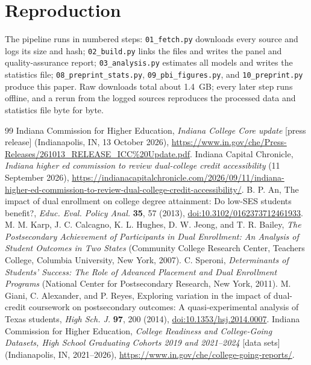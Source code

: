 \documentclass[aps,prd,reprint,superscriptaddress,nofootinbib,floatfix]{revtex4-2}
\begin{document}
\section{Reproduction}\label{app:repro}

The pipeline runs in numbered steps: \texttt{01\_fetch.py} downloads every source and logs its size and hash; \texttt{02\_build.py} links the files and writes the panel and quality-assurance report; \texttt{03\_analysis.py} estimates all models and writes the statistics file; \texttt{08\_preprint\_stats.py}, \texttt{09\_pbi\_figures.py}, and \texttt{10\_preprint.py} produce this paper. Raw downloads total about 1.4~GB; every later step runs offline, and a rerun from the logged sources reproduces the processed data and statistics file byte for byte.

\begin{thebibliography}{99}
 Indiana Commission for Higher Education, \textit{Indiana College Core update} [press release] (Indianapolis, IN, 13 October 2026), \url{https://www.in.gov/che/Press-Releases/261013_RELEASE_ICC\%20Update.pdf}.
 Indiana Capital Chronicle, \textit{Indiana higher ed commission to review dual-college credit accessibility} (11 September 2026), \url{https://indianacapitalchronicle.com/2026/09/11/indiana-higher-ed-commission-to-review-dual-college-credit-accessibility/}.
 B. P. An, The impact of dual enrollment on college degree attainment: Do low-SES students benefit?, \textit{Educ. Eval. Policy Anal.} \textbf{35}, 57 (2013), \href{https://doi.org/10.3102/0162373712461933}{doi:10.3102/0162373712461933}.
 M. M. Karp, J. C. Calcagno, K. L. Hughes, D. W. Jeong, and T. R. Bailey, \textit{The Postsecondary Achievement of Participants in Dual Enrollment: An Analysis of Student Outcomes in Two States} (Community College Research Center, Teachers College, Columbia University, New York, 2007).
 C. Speroni, \textit{Determinants of Students' Success: The Role of Advanced Placement and Dual Enrollment Programs} (National Center for Postsecondary Research, New York, 2011).
 M. Giani, C. Alexander, and P. Reyes, Exploring variation in the impact of dual-credit coursework on postsecondary outcomes: A quasi-experimental analysis of Texas students, \textit{High Sch. J.} \textbf{97}, 200 (2014), \href{https://doi.org/10.1353/hsj.2014.0007}{doi:10.1353/hsj.2014.0007}.
 Indiana Commission for Higher Education, \textit{College Readiness and College-Going Datasets, High School Graduating Cohorts 2019 and 2021--2024} [data sets] (Indianapolis, IN, 2021--2026), \url{https://www.in.gov/che/college-going-reports/}.

\end{thebibliography}
\end{document}

